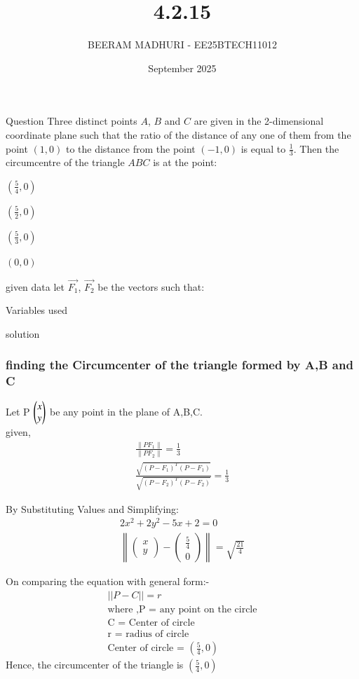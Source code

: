 \documentclass{beamer}
\title %
{4.2.15}
\date{September  2025}
\author %
{BEERAM MADHURI - EE25BTECH11012}
\begin{document}
\frame{\titlepage}
\begin{frame}{Question}
Three distinct points $A$, $B$ and $C$ are given in the 2-dimensional coordinate plane such that the ratio of the distance of any one of them from the point $(1,0)$ to the distance from the point $(-1,0)$ is equal to $\frac{1}{3}$. Then the circumcentre of the triangle $ABC$ is at the point:
\begin{enumerate}
\begin{multicols}{4}
\item $\left(\frac{5}{4}, 0\right)$
\item $\left(\frac{5}{2}, 0\right)$
\item $\left(\frac{5}{3}, 0\right)$
\item $(0, 0)$
\end{multicols}
\end{enumerate}
\end{frame}
 
\begin{frame}{given data}
 let $\vec{F_1}$, $\vec{F_2}$ be the vectors such that:
\begin{table}[h!]
    \centering
    
    \caption{Variables used}
    \label{table 1.9.1}
\end{table}
\end{frame}

\begin{frame}{solution}
    \frametitle{finding the Circumcenter of the triangle formed by A,B and C}
Let P $\begin{pmatrix}x\\y\end{pmatrix}$ be any point in the plane of A,B,C.\\
  given,
\begin{align}
\frac{\| PF_1 \|}{\| PF_2 \|} = \frac{1}{3}\\
\frac{\sqrt{(P-F_1)^T (P-F_1)}}{\sqrt{(P-F_2)^T (P-F_2)}} = \frac{1}{3}
\end{align}

By Substituting Values and Simplifying:
\begin{align}
2x^2 + 2y^2 - 5x + 2 = 0\\
\left\lVert
\begin{pmatrix} x \\ y \end{pmatrix}
-
\begin{pmatrix} \tfrac{5}{4} \\ 0 \end{pmatrix}
\right\lVert
= \sqrt{\tfrac{21}{4}}
\end{align}
\end{frame}
\begin{frame}
On comparing the equation with general form:-
\begin{align}
||P - C|| = r\\
\text{
where ,}
\text{
P = any point on the circle}\\
\text{C = Center of circle}\\
\text{
r = radius of circle}\\
\text{
Center of circle =  } (\frac{5}{4}, 0)
\end{align}
Hence, the circumcenter of the triangle is $(\frac{5}{4}, 0)$
\end{frame}
\end{document}
